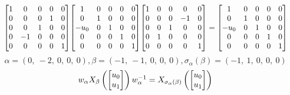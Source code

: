 \documentclass[11pt]{article}
\theoremstyle{definition}
\begin{document}
\[
\scaletoalign{\textwidth}{{\left[\begin{matrix}1 & 0 & 0 & 0 & 0\\0 & 0 & 0 & 1 & 0\\0 & 0 & 1 & 0 & 0\\0 & -1 & 0 & 0 & 0\\0 & 0 & 0 & 0 & 1\end{matrix}\right]} {\left[\begin{matrix}1 & 0 & 0 & 0 & 0\\0 & 1 & 0 & 0 & 0\\- u_{0} & 0 & 1 & 0 & 0\\0 & 0 & 0 & 1 & 0\\0 & 0 & 0 & 0 & 1\end{matrix}\right]} {\left[\begin{matrix}1 & 0 & 0 & 0 & 0\\0 & 0 & 0 & -1 & 0\\0 & 0 & 1 & 0 & 0\\0 & 1 & 0 & 0 & 0\\0 & 0 & 0 & 0 & 1\end{matrix}\right]} = {\left[\begin{matrix}1 & 0 & 0 & 0 & 0\\0 & 1 & 0 & 0 & 0\\- u_{0} & 0 & 1 & 0 & 0\\0 & 0 & 0 & 1 & 0\\0 & 0 & 0 & 0 & 1\end{matrix}\right]}}
\]
\[
\alpha = \left( 0, \  -2, \  0, \  0, \  0\right), \beta = \left( -1, \  -1, \  0, \  0, \  0\right), \sigma_{\alpha}(\beta) = \left( -1, \  1, \  0, \  0, \  0\right)
\]
\[
\scaletoalign{\textwidth}{w_{\alpha} X_{\beta}\left(\left[\begin{matrix}u_{0}\\u_{1}\end{matrix}\right]\right) w_{\alpha}^{-1} = X_{\sigma_{\alpha}\left(\beta\right)}\left(\left[\begin{matrix}u_{0}\\u_{1}\end{matrix}\right]\right)}
\]
\end{document}
